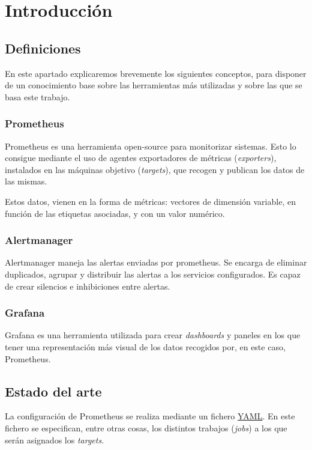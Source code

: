 \chapter{Introducción}
\label{ch:intro}

\section{Definiciones}
En este apartado explicaremos brevemente los siguientes conceptos, para disponer de un conocimiento base sobre las herramientas más utilizadas y sobre las que se basa este trabajo.

\subsection*{Prometheus}
Prometheus\cite{prometheus} es una herramienta open-source para monitorizar sistemas. Esto lo consigue mediante el uso de agentes exportadores de métricas (\textit{exporters}), instalados en las máquinas objetivo (\textit{targets}), que recogen y publican los datos de las mismas.

Estos datos, vienen en la forma de métricas: vectores de dimensión variable, en función de las etiquetas asociadas, y con un valor numérico.

\subsection*{Alertmanager}
Alertmanager\cite{alertmanager} maneja las alertas enviadas por prometheus. Se encarga de eliminar duplicados, agrupar y distribuir las alertas a los servicios configurados. Es capaz de crear silencios e inhibiciones entre alertas.

\subsection*{Grafana}
Grafana\cite{grafana} es una herramienta utilizada para crear \textit{dashboards} y paneles en los que tener una representación más visual de los datos recogidos por, en este caso, Prometheus.


\section{Estado del arte}

La configuración de Prometheus se realiza mediante un fichero \url{YAML}. En este fichero se especifican, entre otras cosas, los distintos trabajos (\textit{jobs}) a los que serán asignados los \textit{targets}. 

